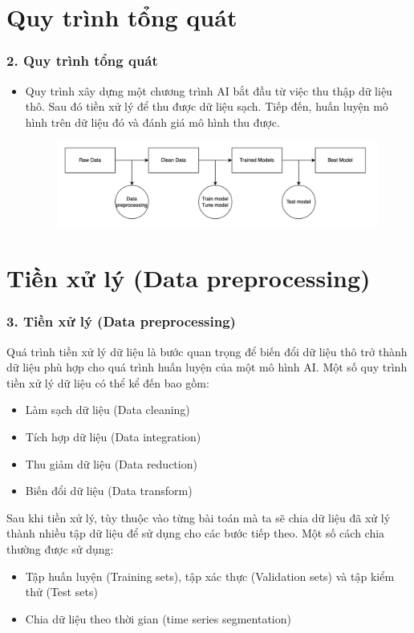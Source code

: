 \documentclass{beamer}
\begin{document}
\section{Quy trình tổng quát}

\begin{frame}
\frametitle{2. Quy trình tổng quát}
\begin{itemize}
\item Quy trình xây dựng một chương trình AI bắt đầu từ việc thu thập dữ liệu thô. Sau đó tiền xử lý để thu được dữ liệu sạch. Tiếp đến, huấn luyện mô hình trên dữ liệu đó và đánh giá mô hình thu được.
\begin{figure}
    \centering
    \includegraphics[width=1\linewidth]{quytrinh.png}
    
    
\end{figure}
\end{itemize}
\end{frame}

\section{Tiền xử lý (Data preprocessing)}

\begin{frame}
\frametitle{3. Tiền xử lý (Data preprocessing)}
Quá trình tiền xử lý dữ liệu là bước quan trọng để biến đổi dữ liệu thô trở thành dữ liệu phù hợp cho quá trình huấn luyện của một mô hình AI. Một số quy trình tiền xử lý dữ liệu có thể kể đến bao gồm:
\begin{itemize}
\item Làm sạch dữ liệu (Data cleaning)
\item Tích hợp dữ liệu (Data integration)
\item Thu giảm dữ liệu (Data reduction)
\item Biến đổi dữ liệu (Data transform)
\end{itemize}
Sau khi tiền xử lý, tùy thuộc vào từng bài toán mà ta sẽ chia dữ liệu đã xử lý thành nhiều tập dữ
liệu để sử dụng cho các bước tiếp theo. Một số cách chia thường được sử dụng:
\begin{itemize}
\item Tập huấn luyện (Training sets), tập xác thực (Validation sets) và tập kiểm thử (Test sets)
\item Chia dữ liệu theo thời gian (time series segmentation)
\end{itemize}
\end{frame}
\end{document}
